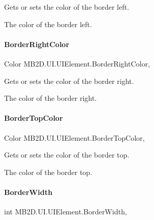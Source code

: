 Gets or sets the color of the border left. 

The color of the border left.\hypertarget{class_m_b2_d_1_1_u_i_1_1_u_i_element_ad9ccf8afb8798ad432e3e08872101bf4}{}\label{class_m_b2_d_1_1_u_i_1_1_u_i_element_ad9ccf8afb8798ad432e3e08872101bf4} 
\paragraph{\texorpdfstring{Border\+Right\+Color}{BorderRightColor}}
{\footnotesize\ttfamily Color M\+B2\+D.\+U\+I.\+U\+I\+Element.\+Border\+Right\+Color\hspace{0.3cm}{\ttfamily [get]}, {\ttfamily [set]}}



Gets or sets the color of the border right. 

The color of the border right.\hypertarget{class_m_b2_d_1_1_u_i_1_1_u_i_element_aa45f78b02d01b2dbec6b4fc217931893}{}\label{class_m_b2_d_1_1_u_i_1_1_u_i_element_aa45f78b02d01b2dbec6b4fc217931893} 
\paragraph{\texorpdfstring{Border\+Top\+Color}{BorderTopColor}}
{\footnotesize\ttfamily Color M\+B2\+D.\+U\+I.\+U\+I\+Element.\+Border\+Top\+Color\hspace{0.3cm}{\ttfamily [get]}, {\ttfamily [set]}}



Gets or sets the color of the border top. 

The color of the border top.\hypertarget{class_m_b2_d_1_1_u_i_1_1_u_i_element_ad20e0ef79012021b00d67fad2b013f94}{}\label{class_m_b2_d_1_1_u_i_1_1_u_i_element_ad20e0ef79012021b00d67fad2b013f94} 
\paragraph{\texorpdfstring{Border\+Width}{BorderWidth}}
{\footnotesize\ttfamily int M\+B2\+D.\+U\+I.\+U\+I\+Element.\+Border\+Width\hspace{0.3cm}{\ttfamily [get]}, {\ttfamily [set]}}



